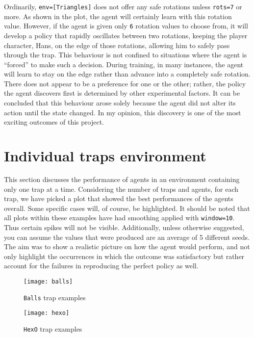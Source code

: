 Ordinarily, \texttt{env=[Triangles]} does not offer any safe rotations unless \texttt{rots=7} or more. As shown in the plot, the agent will certainly learn with this rotation value. However, if the agent is given only \texttt{6} rotation values to choose from, it will develop a policy that rapidly oscillates between two rotations, keeping the player character, Hans, on the edge of those rotations, allowing him to safely pass through the trap. This behaviour is not confined to situations where the agent is ``forced'' to make such a decision. During training, in many instances, the agent will learn to stay on the edge rather than advance into a completely safe rotation. There does not appear to be a preference for one or the other; rather, the policy the agent discovers first is determined by other experimental factors. It can be concluded that this behaviour arose solely because the agent did not alter its action until the state changed. In my opinion, this discovery is one of the most exciting outcomes of this project.

\section{Individual traps environment}
This section discusses the performance of agents in an environment containing only one trap at a time.  Considering the number of traps and agents, for each trap, we have picked a plot that showed the best performances of the agents overall. Some specific cases will, of course, be highlighted. It should be noted that all plots within these examples have had smoothing applied with \texttt{window=10}. Thus certain spikes will not be visible. Additionally, unless otherwise suggested, you can assume the values that were produced are an average of 5 different seeds. The aim was to show a realistic picture on how the agent would perform, and not only highlight the occurrences in which the outcome was satisfactory but rather account for the failures in reproducing the perfect policy as well.

\begin{figure}[h]
    \centering
    \texttt{[image: balls]}
    \caption{\texttt{Balls} trap examples}
    \label{fig:balls_eg}
\end{figure}

\begin{figure}[h]
    \centering
    \texttt{[image: hexo]}
    \caption{\texttt{HexO} trap examples}
    \label{fig:hexo_eg}
\end{figure}


